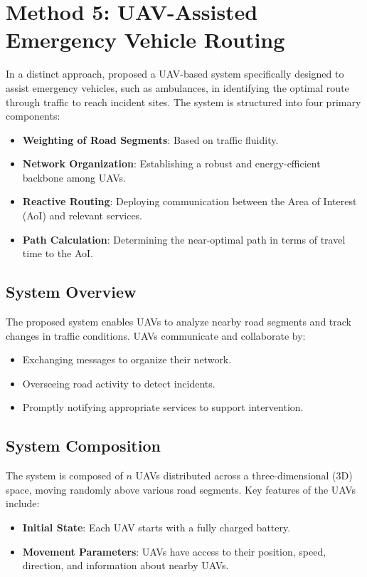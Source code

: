     



\section{Method 5: UAV-Assisted Emergency Vehicle Routing}
\label{sec:method5}

In a distinct approach, \cite{oubbati2019leveraging} proposed a UAV-based system specifically designed to assist emergency vehicles, such as ambulances, in identifying the optimal route through traffic to reach incident sites. The system is structured into four primary components:
\begin{itemize}
    \item \textbf{Weighting of Road Segments}: Based on traffic fluidity.
    \item \textbf{Network Organization}: Establishing a robust and energy-efficient backbone among UAVs.
    \item \textbf{Reactive Routing}: Deploying communication between the Area of Interest (AoI) and relevant services.
    \item \textbf{Path Calculation}: Determining the near-optimal path in terms of travel time to the AoI.
\end{itemize}

\vspace{\baselineskip} %

\subsection{System Overview}
The proposed system enables UAVs to analyze nearby road segments and track changes in traffic conditions. UAVs communicate and collaborate by:
\begin{itemize}
    \item Exchanging messages to organize their network.
    \item Overseeing road activity to detect incidents.
    \item Promptly notifying appropriate services to support intervention.
\end{itemize}

\vspace{\baselineskip} %

\subsection{System Composition}
The system is composed of \( n \) UAVs distributed across a three-dimensional (3D) space, moving randomly above various road segments. Key features of the UAVs include:
\begin{itemize}
    \item \textbf{Initial State}: Each UAV starts with a fully charged battery.
    \item \textbf{Movement Parameters}: UAVs have access to their position, speed, direction, and information about nearby UAVs.
\end{itemize}


